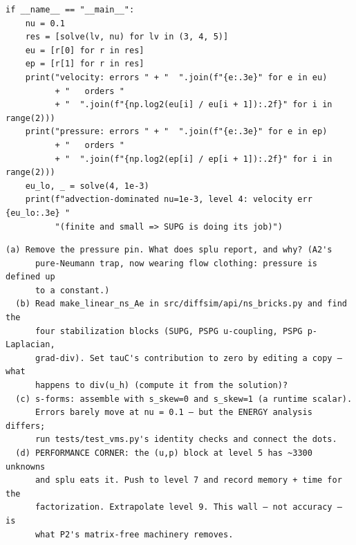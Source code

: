 \begin{lstlisting}
if __name__ == "__main__":
    nu = 0.1
    res = [solve(lv, nu) for lv in (3, 4, 5)]
    eu = [r[0] for r in res]
    ep = [r[1] for r in res]
    print("velocity: errors " + "  ".join(f"{e:.3e}" for e in eu)
          + "   orders "
          + "  ".join(f"{np.log2(eu[i] / eu[i + 1]):.2f}" for i in range(2)))
    print("pressure: errors " + "  ".join(f"{e:.3e}" for e in ep)
          + "   orders "
          + "  ".join(f"{np.log2(ep[i] / ep[i + 1]):.2f}" for i in range(2)))
    eu_lo, _ = solve(4, 1e-3)
    print(f"advection-dominated nu=1e-3, level 4: velocity err {eu_lo:.3e} "
          "(finite and small => SUPG is doing its job)")
\end{lstlisting}

\begin{explore}
\begin{verbatim}
(a) Remove the pressure pin. What does splu report, and why? (A2's
      pure-Neumann trap, now wearing flow clothing: pressure is defined up
      to a constant.)
  (b) Read make_linear_ns_Ae in src/diffsim/api/ns_bricks.py and find the
      four stabilization blocks (SUPG, PSPG u-coupling, PSPG p-Laplacian,
      grad-div). Set tauC's contribution to zero by editing a copy — what
      happens to div(u_h) (compute it from the solution)?
  (c) s-forms: assemble with s_skew=0 and s_skew=1 (a runtime scalar).
      Errors barely move at nu = 0.1 — but the ENERGY analysis differs;
      run tests/test_vms.py's identity checks and connect the dots.
  (d) PERFORMANCE CORNER: the (u,p) block at level 5 has ~3300 unknowns
      and splu eats it. Push to level 7 and record memory + time for the
      factorization. Extrapolate level 9. This wall — not accuracy — is
      what P2's matrix-free machinery removes.
\end{verbatim}
\end{explore}
